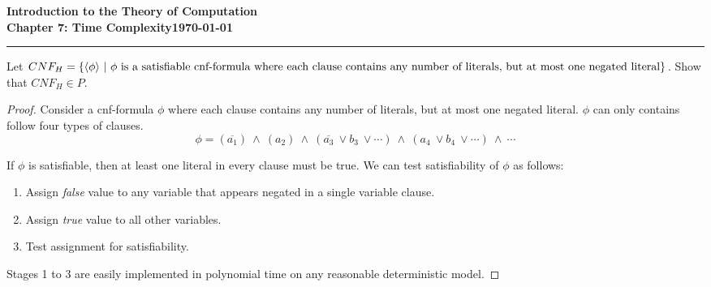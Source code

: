 \documentclass[11pt]{article}
\newcommand{\dated}{\today}
\begin{document}
\textbf{Introduction to the Theory of
Computation}\hfill\textbf{\myname}\\[0.01in]
\textbf{Chapter 7: Time Complexity}\hfill\textbf{\dated}\\
\smallskip\hrule\bigskip

\begin{problem}{7.25}
Let $CNF_H = \{\langle \phi \rangle \ | \ \phi \text{ is a satisfiable cnf-formula where each clause contains } \\ \text{any number of literals, but at most one negated literal}\}$. Show that $CNF_H \in P$.
\end{problem}

\begin{proof}
Consider a cnf-formula $\phi$ where each clause contains any number of literals, but at most one negated literal. $\phi$ can only contains follow four types of clauses.
\[
\phi = (\overline{a_1}) \ \wedge \ ({a_2}) \ \wedge \ (\overline{a_3} \ \vee b_3 \ \vee \cdots) \ \wedge \ (a_4 \ \vee b_4 \ \vee \cdots) \ \wedge \ \cdots
\]

If $\phi$ is satisfiable, then at least one literal in every clause must be true. We can test satisfiability of $\phi$ as follows:
\begin{enumerate}
\item Assign \textit{false} value to any variable that appears negated in a single variable clause.
\item Assign \textit{true} value to all other variables.
\item Test assignment for satisfiability.
\end{enumerate}
Stages 1 to 3 are easily implemented in polynomial time on any reasonable deterministic model.
\end{proof}
\end{document}

